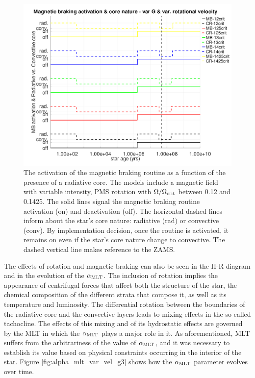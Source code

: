 \documentclass[fleqn,usenatbib]{mnras}
\begin{document}
\begin{figure}
	\includegraphics[clip,width=\columnwidth]{figures/paper2/mb_act_var_vel_g3.pdf}
    \caption{The activation of the magnetic braking routine as a function of the presence of a radiative core. The models include a magnetic field with variable intensity, PMS rotation with $\Omega / \Omega_{\mathrm{crit}}$ between 0.12 and 0.1425. The solid lines signal the magnetic braking routine activation (on) and deactivation (off). The horizontal dashed lines inform about the star's core nature: radiative (rad) or convective (conv). By implementation decision, once the routine is activated, it remains on even if the star's core nature change to convective. The dashed vertical line makes reference to the ZAMS.}
    \label{fig:mb_act_var_vel_g3}
\end{figure}

The effects of rotation and magnetic braking can also be seen in the H-R diagram and in the evolution of the $\alpha_{\mathrm{MLT}}$. The inclusion of rotation implies the appearance of centrifugal forces that affect both the structure of the star, the chemical composition of the different strata that compose it, as well as its temperature and luminosity. The differential rotation between the boundaries of the radiative core and the convective layers leads to mixing effects in the so-called tachocline. The effects of this mixing and of its hydrostatic effects are governed by the MLT in which the $\alpha_{\mathrm{MLT}}$ plays a major role in it. As aforementioned, MLT suffers from the arbitrariness of the value of $\alpha_{\mathrm{MLT}}$, and it was necessary to establish its value based on physical constraints occurring in the interior of the star. Figure \ref{fig:alpha_mlt_var_vel_g3} shows how the $\alpha_{\mathrm{MLT}}$ parameter evolves over time.\par 
\end{document}
